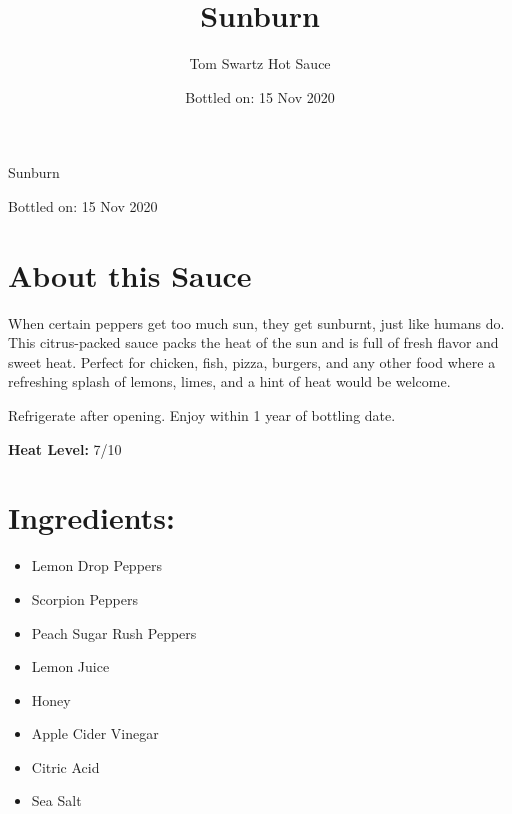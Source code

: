 \documentclass[12pt]{article}
\title{Sunburn}
\author{Tom Swartz Hot Sauce}
\date{Bottled on: 15 Nov 2020}
\begin{document}
\begin{center}
{\Huge Sunburn}
\par
{\Large Bottled on: 15 Nov 2020}
\vfill
\begin{minipage}{0.45\textwidth}
\Large
\section*{About this Sauce \color{black}\hrulefill\color{black}}
When certain peppers get too much sun, they get sunburnt, just like humans do.
This citrus-packed sauce packs the heat of the sun and is full of fresh flavor and sweet heat.
Perfect for chicken, fish, pizza, burgers, and any other food where a refreshing
splash of lemons, limes, and a hint of heat would be welcome.
\par
Refrigerate after opening.
Enjoy within 1 year of bottling date.
\begin{center}
        {\LARGE
        \textbf{Heat Level:} 7/10
        }
\end{center}
\end{minipage}
\hfill
\begin{minipage}{0.45\textwidth}
\vspace{-0.4cm}
\Large
\section*{\hspace{0.5cm}Ingredients: \color{black}\hrulefill\color{black}}
\begin{itemize}
        \item Lemon Drop Peppers
        \item Scorpion Peppers
        \item Peach Sugar Rush Peppers
        \item Lemon Juice
        \item Honey
        \item Apple Cider Vinegar
        \item Citric Acid
        \item Sea Salt
\end{itemize}
\end{minipage}
\end{center}
\end{document}
